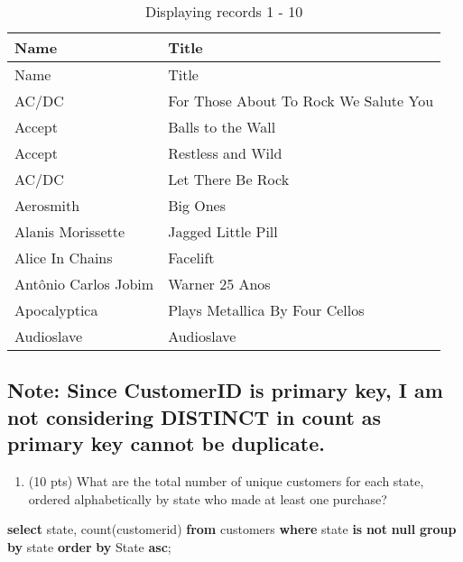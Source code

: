 \documentclass[
]{article}
\newenvironment{Shaded}{\begin{snugshade}}{\end{snugshade}}
\newcommand{\FunctionTok}[1]{\textcolor[rgb]{0.00,0.00,0.00}{#1}}
\newcommand{\KeywordTok}[1]{\textcolor[rgb]{0.13,0.29,0.53}{\textbf{#1}}}
\newcommand{\NormalTok}[1]{#1}
\providecommand{\tightlist}{%
  \setlength{\itemsep}{0pt}\setlength{\parskip}{0pt}}
\begin{document}
\begin{longtable}[]{@{}ll@{}}
\caption{Displaying records 1 - 10}\tabularnewline
\toprule
Name & Title \\
\midrule
\endfirsthead
\toprule
Name & Title \\
\midrule
\endhead
AC/DC & For Those About To Rock We Salute You \\
Accept & Balls to the Wall \\
Accept & Restless and Wild \\
AC/DC & Let There Be Rock \\
Aerosmith & Big Ones \\
Alanis Morissette & Jagged Little Pill \\
Alice In Chains & Facelift \\
Antônio Carlos Jobim & Warner 25 Anos \\
Apocalyptica & Plays Metallica By Four Cellos \\
Audioslave & Audioslave \\
\bottomrule
\end{longtable}

\hypertarget{note-since-customerid-is-primary-key-i-am-not-considering-distinct-in-count-as-primary-key-cannot-be-duplicate.}{%
\subsection{Note: Since CustomerID is primary key, I am not considering
DISTINCT in count as primary key cannot be
duplicate.}\label{note-since-customerid-is-primary-key-i-am-not-considering-distinct-in-count-as-primary-key-cannot-be-duplicate.}}

\begin{enumerate}
\def\labelenumi{\arabic{enumi}.}
\setcounter{enumi}{2}
\tightlist
\item
  (10 pts) What are the total number of unique customers for each state,
  ordered alphabetically by state who made at least one purchase?
\end{enumerate}

\begin{Shaded}
\begin{Highlighting}[]

\KeywordTok{select}\NormalTok{ state, }\FunctionTok{count}\NormalTok{(customerid)}
\KeywordTok{from}\NormalTok{ customers}
\KeywordTok{where}\NormalTok{ state }\KeywordTok{is} \KeywordTok{not} \KeywordTok{null}
\KeywordTok{group} \KeywordTok{by}\NormalTok{ state}
\KeywordTok{order} \KeywordTok{by}\NormalTok{ State }\KeywordTok{asc}\NormalTok{;}
\end{Highlighting}
\end{Shaded}
\end{document}
